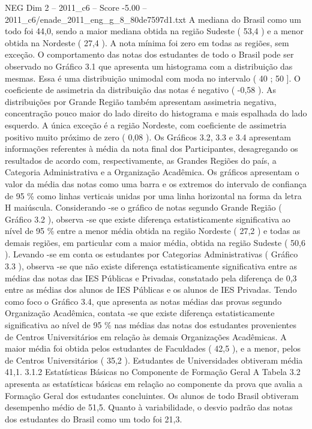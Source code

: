 \begin{textsample}{NEG Dim 2 – 2011\_c6 – Score -5.00 – 2011\_c6/enade\_2011\_eng\_g\_8\_80de7597d1.txt}
A mediana do Brasil como um todo foi 44,0, sendo a maior mediana obtida na região Sudeste ( 53,4 ) e a menor obtida na Nordeste ( 27,4 ).
A nota mínima foi zero em todas as regiões, sem exceção.
O comportamento das notas dos estudantes de todo o Brasil pode ser observado no Gráfico 3.1 que apresenta um histograma com a distribuição das mesmas.
Essa é uma distribuição unimodal com moda no intervalo ( 40 ; 50 ].
O coeficiente de assimetria da distribuição das notas é negativo ( -0,58 ).
As distribuições por Grande Região também apresentam assimetria negativa, concentração pouco maior do lado direito do histograma e mais espalhada do lado esquerdo.
A única exceção é a região Nordeste, com coeficiente de assimetria positivo muito próximo de zero ( 0,08 ).
Os Gráficos 3.2, 3.3 e 3.4 apresentam informações referentes à média da nota final dos Participantes, desagregando os resultados de acordo com, respectivamente, as Grandes Regiões do país, a Categoria Administrativa e a Organização Acadêmica.
Os gráficos apresentam o valor da média das notas como uma barra e os extremos do intervalo de confiança de 95 \% como linhas verticais unidas por uma linha horizontal na forma da letra H maiúscula.
Considerando -se o gráfico de notas segundo Grande Região ( Gráfico 3.2 ), observa -se que existe diferença estatisticamente significativa ao nível de 95 \% entre a menor média obtida na região Nordeste ( 27,2 ) e todas as demais regiões, em particular com a maior média, obtida na região Sudeste ( 50,6 ).
Levando -se em conta os estudantes por Categorias Administrativas ( Gráfico 3.3 ), observa -se que não existe diferença estatisticamente significativa entre as médias das notas das IES Públicas e Privadas, constatado pela diferença de 0,3 entre as médias dos alunos de IES Públicas e os alunos de IES Privadas.
Tendo como foco o Gráfico 3.4, que apresenta as notas médias das provas segundo Organização Acadêmica, contata -se que existe diferença estatisticamente significativa ao nível de 95 \% nas médias das notas dos estudantes provenientes de Centros Universitários em relação às demais Organizações Acadêmicas.
A maior média foi obtida pelos estudantes de Faculdades ( 42,5 ), e a menor, pelos de Centros Universitários ( 35,2 ).
Estudantes de Universidades obtiveram média 41,1. 3.1.2 Estatísticas Básicas no Componente de Formação Geral A Tabela 3.2 apresenta as estatísticas básicas em relação ao componente da prova que avalia a Formação Geral dos estudantes concluintes.
Os alunos de todo Brasil obtiveram desempenho médio de 51,5.
Quanto à variabilidade, o desvio padrão das notas dos estudantes do Brasil como um todo foi 21,3.

\end{textsample}
